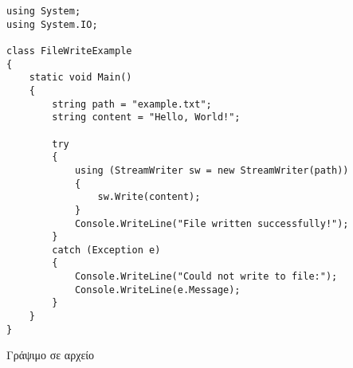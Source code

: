 \begin{listing}[H]    
\begin{verbatim}
using System;
using System.IO;

class FileWriteExample
{
    static void Main()
    {
        string path = "example.txt";
        string content = "Hello, World!";

        try
        {
            using (StreamWriter sw = new StreamWriter(path))
            {
                sw.Write(content);
            }
            Console.WriteLine("File written successfully!");
        } 
        catch (Exception e)
        {
            Console.WriteLine("Could not write to file:");
            Console.WriteLine(e.Message);
        }
    }
}
\end{verbatim}
\caption{Γράψιμο σε αρχείο}
\label{WriteFile}
\end{listing}
